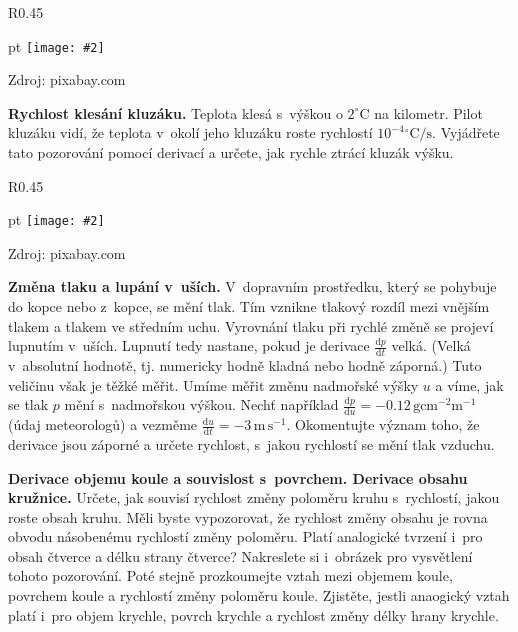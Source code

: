\documentclass{article}
\newcommand\obrazek[2][pixabay.com]{
  \clearpage
\begin{wrapfigure}{R}{0.45\linewidth}
  \begin{minipage}{1.0\linewidth}\parskip 0 pt
  \texttt{[image: \#2]}

  \vspace*{-10pt}
  \null\hfill{\color{gray}\footnotesize Zdroj: #1}
    
  \end{minipage}
\end{wrapfigure}
}
\let\oldtextbf\textbf
\def\textbf#1{%
  \oldtextbf{\color{red} #1}}
\def\stranka{\newpage}
\begin{document}
\obrazek{kluzak.jpg}
\textbf{Rychlost klesání kluzáku.}
Teplota klesá s výškou o $2^\circ \mathrm C$ na kilometr. Pilot
kluzáku vidí, že teplota v okolí jeho kluzáku roste rychlostí
$10^{-4}{}^\circ \mathrm C/\mathrm{s}$. Vyjádřete tato pozorování pomocí
derivací a určete, jak rychle ztrácí kluzák výšku.

\obrazek{autobus.jpg} \textbf{Změna tlaku a lupání v uších.}
V dopravním prostředku, který se pohybuje do kopce nebo z kopce, se
mění tlak. Tím vznikne tlakový rozdíl mezi vnějším tlakem a tlakem ve
středním uchu. Vyrovnání tlaku při rychlé změně se projeví lupnutím
v uších.  Lupnutí tedy nastane, pokud je derivace
$\frac {\mathrm d p}{\mathrm dt}$ velká. (Velká v absolutní hodnotě,
tj. numericky hodně kladná nebo hodně záporná.)  Tuto veličinu však je
těžké měřit. Umíme měřit změnu nadmořské výšky $u$ a víme, jak se tlak
$p$ mění s nadmořskou výškou. Nechť například
$\frac{\mathrm dp}{\mathrm
  du}=-0.12\,\mathrm{g}\mathrm{cm}^{-2}\mathrm{m}^{-1}$ (údaj
meteorologů) a vezměme
$ \frac{\mathrm du}{\mathrm
  dt}=-3\,\mathrm{m}\,\mathrm{s}^{-1}$. Okomentujte význam toho, že
derivace jsou záporné a určete rychlost, s jakou rychlostí se mění
tlak vzduchu.

\stranka

\textbf{Derivace objemu koule a souvislost s povrchem. Derivace obsahu
  kružnice.}  Určete, jak souvisí rychlost změny poloměru kruhu
s rychlostí, jakou roste obsah kruhu. Měli byste vypozorovat, že
rychlost změny obsahu je rovna obvodu násobenému rychlostí změny
poloměru. Platí analogické tvrzení i pro obsah čtverce a délku strany
čtverce? Nakreslete si i obrázek pro vysvětlení tohoto
pozorování. Poté stejně prozkoumejte vztah mezi objemem koule,
povrchem koule a rychlostí změny poloměru koule. Zjistěte, jestli
anaogický vztah platí i pro objem krychle, povrch krychle a rychlost
změny délky hrany krychle.
\end{document}
